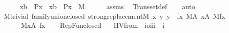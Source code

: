 \begin{isabellebody}
\ \ \isanewline
\ \ \ \ {\isachardoublequoteopen}{\isacharbraceleft}{\kern0pt}x{\isasymin}b\ {\isachardot}{\kern0pt}\ P{\isacharparenleft}{\kern0pt}x{\isacharparenright}{\kern0pt}{\isacharbraceright}{\kern0pt}\ {\isacharequal}{\kern0pt}\ {\isacharbraceleft}{\kern0pt}x{\isasymin}b\ {\isachardot}{\kern0pt}\ P{\isacharparenleft}{\kern0pt}x{\isacharparenright}{\kern0pt}{\isacharbraceright}{\kern0pt}\ {\isasyminter}\ M{\isachardoublequoteclose}\isanewline
%
\isadelimproof
\ \ \ \ %
\endisadelimproof
%
\isatagproof
{}\isamarkupfalse%
\ assms\ \isamarkupfalse%
\ Transset{\isacharunderscore}{\kern0pt}def\isanewline
\ \ \isamarkupfalse%
\ {\isacharparenleft}{\kern0pt}auto{\isacharparenright}{\kern0pt}%
\endisatagproof
{\isafoldproof}%
%
\isadelimproof
\ \ \isanewline
%
\endisadelimproof
\isanewline
{}\isamarkupfalse%
\ {\isacharparenleft}{\kern0pt}\ M{\isacharunderscore}{\kern0pt}trivial{\isacharparenright}{\kern0pt}\ family{\isacharunderscore}{\kern0pt}union{\isacharunderscore}{\kern0pt}closed{\isacharcolon}{\kern0pt}\ {\isachardoublequoteopen}{\isasymlbrakk}strong{\isacharunderscore}{\kern0pt}replacement{\isacharparenleft}{\kern0pt}M{\isacharcomma}{\kern0pt}\ {\isasymlambda}x\ y{\isachardot}{\kern0pt}\ y\ {\isacharequal}{\kern0pt}\ f{\isacharparenleft}{\kern0pt}x{\isacharparenright}{\kern0pt}{\isacharparenright}{\kern0pt}{\isacharsemicolon}{\kern0pt}\ M{\isacharparenleft}{\kern0pt}A{\isacharparenright}{\kern0pt}{\isacharsemicolon}{\kern0pt}\ {\isasymforall}x{\isasymin}A{\isachardot}{\kern0pt}\ M{\isacharparenleft}{\kern0pt}f{\isacharparenleft}{\kern0pt}x{\isacharparenright}{\kern0pt}{\isacharparenright}{\kern0pt}{\isasymrbrakk}\isanewline
\ \ \ \ \ \ {\isasymLongrightarrow}\ M{\isacharparenleft}{\kern0pt}{\isasymUnion}x{\isasymin}A{\isachardot}{\kern0pt}\ f{\isacharparenleft}{\kern0pt}x{\isacharparenright}{\kern0pt}{\isacharparenright}{\kern0pt}{\isachardoublequoteclose}\isanewline
%
\isadelimproof
\ \ %
\endisadelimproof
%
\isatagproof
{}\isamarkupfalse%
\ RepFun{\isacharunderscore}{\kern0pt}closed\ \isacommand{{\isachardot}{\kern0pt}{\isachardot}{\kern0pt}}\isamarkupfalse%
%
\endisatagproof
{\isafoldproof}%
%
\isadelimproof
\isanewline
%
\endisadelimproof
\isanewline
\isanewline
\isanewline
{}\isamarkupfalse%
\isanewline
\ \ HVfrom\ {\isacharcolon}{\kern0pt}{\isacharcolon}{\kern0pt}\ {\isachardoublequoteopen}{\isacharbrackleft}{\kern0pt}i{\isasymRightarrow}o{\isacharcomma}{\kern0pt}i{\isacharcomma}{\kern0pt}i{\isacharcomma}{\kern0pt}i{\isacharbrackright}{\kern0pt}\ {\isasymRightarrow}\ i{\isachardoublequoteclose}\ \isanewline

\end{isabellebody}
